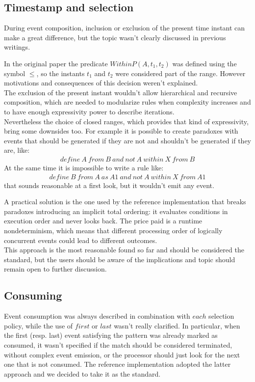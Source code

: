 \subsection{Timestamp and selection}
During event composition, inclusion or exclusion of the present time instant can make a great difference, but the topic wasn't clearly discussed in previous writings.

In the original paper the predicate $WithinP(A, t_1, t_2)$ was defined using the symbol $\le$, so the instants $t_1$ and $t_2$ were considered part of the range. However motivations and consequences of this decision weren't explained.\\
The exclusion of the present instant wouldn't allow hierarchical and recursive composition, which are needed to modularize rules when complexity increases and to have enough expressivity power to describe iterations.\\
Nevertheless the choice of closed ranges, which provides that kind of expressivity, bring some downsides too. For example it is possible to create paradoxes with events that should be generated if they are not and shouldn't be generated if they are, like:
\begin{align*}
define\ A\ from\ B\ and\ not\ A\ within\ X\ from\ B
\end{align*}
At the same time it is impossible to write a rule like:
\begin{align*}
define\ B\ from\ A\ as\ A1\ and\ not\ A\ within\ X\ from\ A1
\end{align*}
that sounds reasonable at a first look, but it wouldn't emit any event.

A practical solution is the one used by the reference implementation that breaks paradoxes introducing an implicit total ordering: it evaluates conditions in execution order and never looks back. The price paid is a runtime nondeterminism, which means that different processing order of logically concurrent events could lead to different outcomes.\\
This approach is the most reasonable found so far and should be considered the standard, but the users should be aware of the implications and topic should remain open to further discussion.

\subsection{Consuming}
Event consumption was always described in combination with $each$ selection policy, while the use of $first$ or $last$ wasn't really clarified. In particular, when the first (resp. last) event satisfying the pattern was already marked as consumed, it wasn't specified if the match should be considered terminated, without complex event emission, or the processor should just look for the next one that is not consumed. The reference implementation adopted the latter approach and we decided to take it as the standard.
